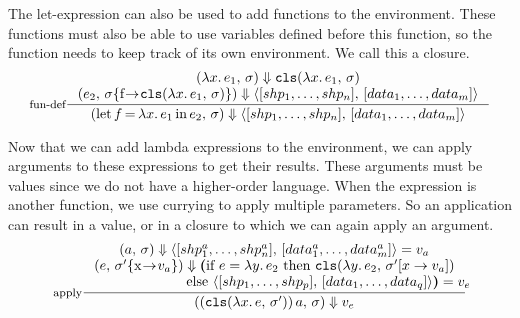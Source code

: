 \documentclass[../main.tex]{subfiles}
\newcommand{\cls}[2]{\texttt{cls}(#1,\, #2)}
\begin{document}
The let-expression can also be used to add functions to the environment. These functions must also be able to use variables defined before this function, so the function needs to keep track of its own environment. We call this a closure.
\[
\inference[fun-def]{
    \sempair{\lambdaexpr{x}{e_1}}
        \Downarrow \cls{\lambdaexpr{x}{e_1}}{\sigma} \\
    \sempair[\envmap{\sigma}{f}{\cls{\lambdaexpr{x}{e_1}}{\sigma}}]{e_2}
        \Downarrow \valpair{[shp_1, \dots, shp_n]}{[data_1, \dots, data_m]}
    }{
    \sempair{\letexpr{f}{\lambdaexpr{x}{e_1}}{e_2}}
        \Downarrow \valpair{[shp_1, \dots, shp_n]}{[data_1, \dots, data_m]}
    }
\]

Now that we can add lambda expressions to the environment, we can apply arguments to these expressions to get their results. These arguments must be values since we do not have a higher-order language. When the expression is another function, we use currying to apply multiple parameters. So an application can result in a value, or in a closure to which we can again apply an argument.
\[
\inference[apply]{
    \sempair{a}
        \Downarrow \valpair{[shp_1^a, \dots, shp_n^a]}{[data_1^a, \dots, data_m^a]} = v_a \\
    \sempair[\envmap{\sigma'}{x}{v_a}]{e}
        \Downarrow \boldsymbol{(}
            \text{if } e = \lambdaexpr{y}{e_2} \text{ then }
                \cls{\lambdaexpr{y}{e_2}}{\sigma'[x \to v_a]} \\
            \text{ else }
                \valpair{[shp_1, \dots, shp_p]}{[data_1, \dots, data_q]}
        \boldsymbol{)} = v_e \hspace{-26mm}\\
    }{
    \sempair{(\cls{\lambdaexpr{x}{e}}{\sigma'})\, a} \Downarrow v_e
    }
\]
\end{document}
